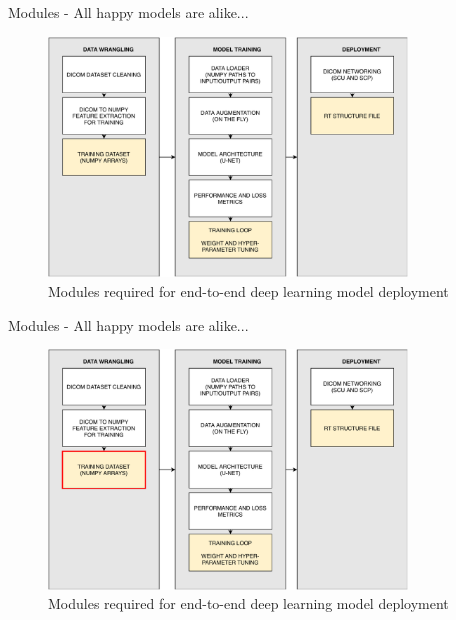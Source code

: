 \documentclass[9pt]{beamer}
\begin{document}
\begin{frame}{Modules - All happy models are alike...}
\begin{figure}
\includegraphics[width=0.85\textwidth]{images/modules_blank}
\caption{Modules required for end-to-end deep learning model deployment}
\end{figure}
\end{frame}

\begin{frame}{Modules - All happy models are alike...}
  \begin{figure}
    \includegraphics[width=0.85\textwidth]{images/modules_data}
    \caption{Modules required for end-to-end deep learning model deployment}
  \end{figure}
\end{frame}
\end{document}
